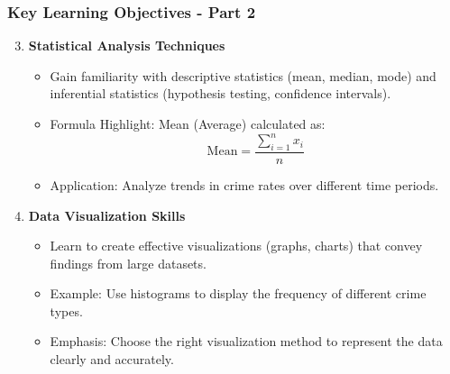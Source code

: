 \documentclass[aspectratio=169]{beamer}
\begin{document}
\begin{frame}[fragile]
    \frametitle{Key Learning Objectives - Part 2}
    \begin{enumerate}
        \setcounter{enumi}{2}
        \item \textbf{Statistical Analysis Techniques}
        \begin{itemize}
            \item Gain familiarity with descriptive statistics (mean, median, mode) and inferential statistics (hypothesis testing, confidence intervals).
            \item Formula Highlight: Mean (Average) calculated as:
            \begin{equation}
                \text{Mean} = \frac{\sum_{i=1}^{n} x_i}{n}
            \end{equation}
            \item Application: Analyze trends in crime rates over different time periods.
        \end{itemize}
        
        \item \textbf{Data Visualization Skills}
        \begin{itemize}
            \item Learn to create effective visualizations (graphs, charts) that convey findings from large datasets.
            \item Example: Use histograms to display the frequency of different crime types.
            \item Emphasis: Choose the right visualization method to represent the data clearly and accurately.
        \end{itemize}
    \end{enumerate}
\end{frame}
\end{document}
